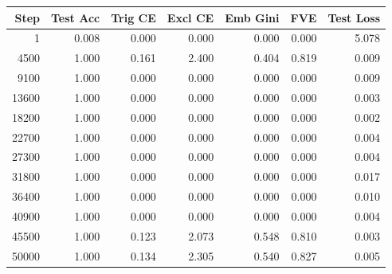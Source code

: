 \begin{longtable}{rrrrrrr}
\toprule
Step & Test Acc & Trig CE & Excl CE & Emb Gini & FVE & Test Loss \\
\midrule
\endhead
1 & 0.008 & 0.000 & 0.000 & 0.000 & 0.000 & 5.078 \\
4500 & 1.000 & 0.161 & 2.400 & 0.404 & 0.819 & 0.009 \\
9100 & 1.000 & 0.000 & 0.000 & 0.000 & 0.000 & 0.009 \\
13600 & 1.000 & 0.000 & 0.000 & 0.000 & 0.000 & 0.003 \\
18200 & 1.000 & 0.000 & 0.000 & 0.000 & 0.000 & 0.002 \\
22700 & 1.000 & 0.000 & 0.000 & 0.000 & 0.000 & 0.004 \\
27300 & 1.000 & 0.000 & 0.000 & 0.000 & 0.000 & 0.004 \\
31800 & 1.000 & 0.000 & 0.000 & 0.000 & 0.000 & 0.017 \\
36400 & 1.000 & 0.000 & 0.000 & 0.000 & 0.000 & 0.010 \\
40900 & 1.000 & 0.000 & 0.000 & 0.000 & 0.000 & 0.004 \\
45500 & 1.000 & 0.123 & 2.073 & 0.548 & 0.810 & 0.003 \\
50000 & 1.000 & 0.134 & 2.305 & 0.540 & 0.827 & 0.005 \\
\bottomrule
\end{longtable}
